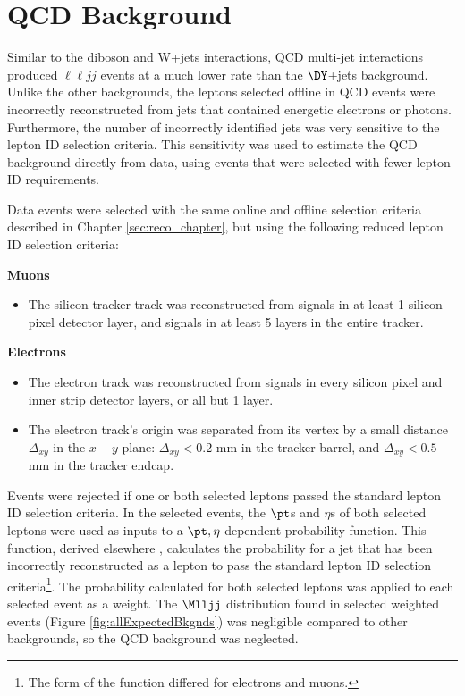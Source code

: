 \section{QCD Background}
\label{sec:qcdBkgnd}
Similar to the diboson and W+jets interactions, QCD multi-jet interactions produced $\ell\ell jj$ events at a much lower rate than the 
$\DY$+jets background.  Unlike the other backgrounds, the leptons selected offline in QCD events were incorrectly reconstructed from 
jets that contained energetic electrons or photons.  Furthermore, the number of incorrectly identified jets was very sensitive to the 
lepton ID selection criteria.  This sensitivity was used to estimate the QCD background directly from data, using events that 
were selected with fewer lepton ID requirements.

Data events were selected with the same online and offline selection criteria described in Chapter \ref{sec:reco_chapter}, but using 
the following reduced lepton ID selection criteria:

\textbf{Muons}
\begin{itemize}
	\item The silicon tracker track was reconstructed from signals in at least 1 silicon pixel detector layer, and signals in at least 
		5 layers in the entire tracker.
\end{itemize}

\textbf{Electrons}
\begin{itemize}
	\item The electron track was reconstructed from signals in every silicon pixel and inner strip detector layers, or all but 1 layer.
	\item The electron track's origin was separated from its vertex by a small distance $\Delta_{xy}$ in the $x-y$ 
		plane: $\Delta_{xy} < 0.2$ mm in the tracker barrel, and $\Delta_{xy} < 0.5$ mm in the tracker endcap.
\end{itemize}

Events were rejected if one or both selected leptons passed the standard lepton ID selection criteria.  In the selected events, 
the $\pt$s and $\eta$s of both selected leptons were used as inputs to a $\pt,\eta$-dependent probability function.  This function, 
derived elsewhere \cite{ZprimeRunOneAndTwo}, calculates the probability for a jet that has been incorrectly reconstructed as a lepton 
to pass the standard lepton ID selection criteria\footnote{The form of the function differed for electrons and muons.}.  The 
probability calculated for both selected leptons was applied to each selected event as a weight.  The $\Mlljj$ distribution found in 
selected weighted events (Figure \ref{fig:allExpectedBkgnds}) was negligible compared to other backgrounds, so the QCD background was 
neglected.

